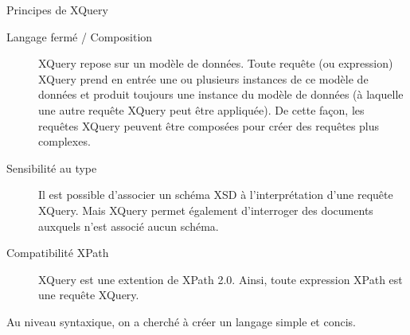 \begin{frame}[allowframebreaks]{Principes de XQuery}

\begin{description}
\item[Langage fermé / Composition] XQuery repose sur un modèle de données. Toute requête (ou expression) XQuery prend en entrée une ou plusieurs instances de ce modèle de données et produit toujours une instance du modèle de données (à laquelle une autre requête XQuery peut être appliquée). De cette façon, les requêtes XQuery peuvent être composées pour créer des requêtes plus complexes.
\item[Sensibilité au type] Il est possible d'associer un schéma XSD à l'interprétation d'une requête XQuery. Mais XQuery permet également d'interroger des documents auxquels n'est associé aucun schéma.
\item[Compatibilité XPath] XQuery est une extention de XPath 2.0. Ainsi, toute expression XPath est une requête XQuery. 
\end{description}

Au niveau syntaxique, on a cherché à créer un langage simple et concis.
\end{frame}

